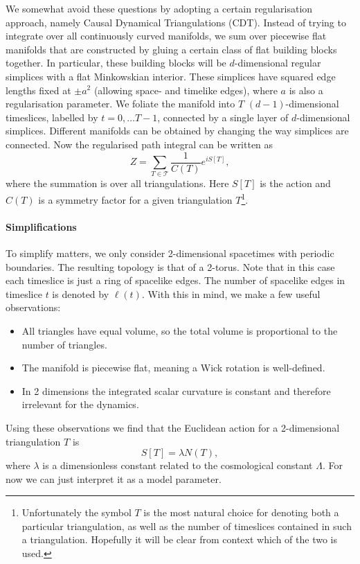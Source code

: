 We somewhat avoid these questions by adopting a certain regularisation approach, namely Causal Dynamical Triangulations (CDT). Instead of trying to integrate over all continuously curved manifolds, we sum over piecewise flat manifolds that are constructed by gluing a certain class of flat building blocks together. In particular, these building blocks will be $d$-dimensional regular simplices with a flat Minkowskian interior. These simplices have squared edge lengths fixed at $\pm a^2$ (allowing space- and timelike edges), where $a$ is also a regularisation parameter. We foliate the manifold into $T$ $(d - 1)$-dimensional timeslices, labelled by $t = 0, \ldots T - 1$, connected by a single layer of $d$-dimensional simplices. Different manifolds can be obtained by changing the way simplices are connected. Now the regularised path integral can be written as
\begin{equation}
    Z
    =
    \sum_{T \in \mathcal{T}} \frac{1}{C(T)} e^{i S[T]}
    ,
\end{equation}
where the summation is over all triangulations. Here $S[T]$ is the action and $C(T)$ is a symmetry factor for a given triangulation $T$\footnote{Unfortunately the symbol $T$ is the most natural choice for denoting both a particular triangulation, as well as the number of timeslices contained in such a triangulation. Hopefully it will be clear from context which of the two is used.}.

\paragraph{Simplifications} To simplify matters, we only consider 2-dimensional spacetimes with periodic boundaries. The resulting topology is that of a 2-torus. Note that in this case each timeslice is just a ring of spacelike edges. The number of spacelike edges in timeslice $t$ is denoted by $\ell(t)$. With this in mind, we make a few useful observations:
\begin{itemize}
    \item All triangles have equal volume, so the total volume is proportional to the number of triangles.
    \item The manifold is piecewise flat, meaning a Wick rotation is well-defined.
    \item In 2 dimensions the integrated scalar curvature is constant and therefore irrelevant for the dynamics.
\end{itemize}
Using these observations we find that the Euclidean action for a 2-dimensional triangulation $T$ is \cite{2012}
\begin{equation}
    S[T] = \lambda N(T),
\end{equation}
where $\lambda$ is a dimensionless constant related to the cosmological constant $\Lambda$. For now we can just interpret it as a model parameter.

